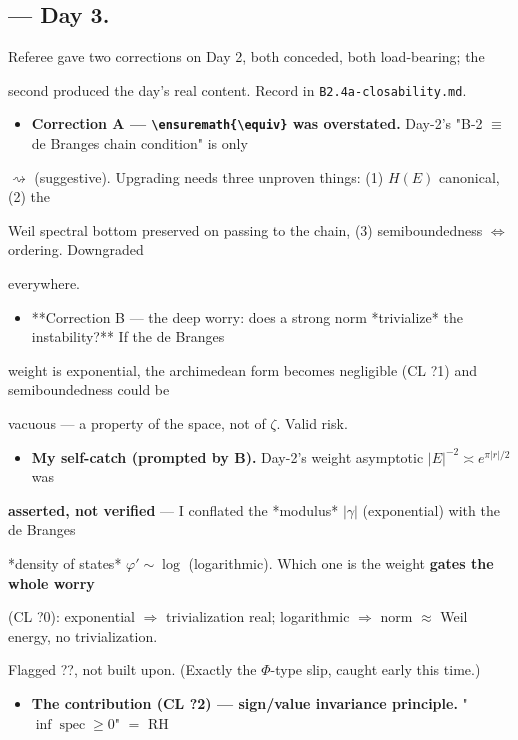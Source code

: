 \documentclass[10pt]{article}
\begin{document}
\subsection*{ --- Day 3.}
Referee gave two corrections on Day 2, both conceded, both load-bearing; the\par
second produced the day's real content. Record in \texttt{B2.4a-closability.md}.\par
\begin{itemize}
\item \textbf{Correction A --- \texttt{\textbackslash{}ensuremath\{\textbackslash{}equiv\}} was overstated.} Day-2's "B-2 $\equiv$ de Branges chain condition" is only
\end{itemize}
  $\rightsquigarrow$ (suggestive). Upgrading needs three unproven things: (1) $H(E)$ canonical, (2) the\par
  Weil spectral bottom preserved on passing to the chain, (3) semiboundedness $\iff$ ordering. Downgraded\par
  everywhere.\par
\begin{itemize}
\item **Correction B --- the deep worry: does a strong norm *trivialize* the instability?** If the de Branges
\end{itemize}
  weight is exponential, the archimedean form becomes negligible (CL ?1) and semiboundedness could be\par
  vacuous --- a property of the space, not of $\zeta$. Valid risk.\par
\begin{itemize}
\item \textbf{My self-catch (prompted by B).} Day-2's weight asymptotic $|E|^{-2}\asymp e^{\pi|r|/2}$ was
\end{itemize}
  \textbf{asserted, not verified} --- I conflated the *modulus* $|\gamma|$ (exponential) with the de Branges\par
  *density of states* $\varphi'\sim\log$ (logarithmic). Which one is the weight \textbf{gates the whole worry}\par
  (CL ?0): exponential \ensuremath{\Rightarrow} trivialization real; logarithmic \ensuremath{\Rightarrow} norm $\approx$ Weil energy, no trivialization.\par
  Flagged ??, not built upon. (Exactly the $\Phi$-type slip, caught early this time.)\par
\begin{itemize}
\item \textbf{The contribution (CL ?2) --- sign/value invariance principle.} "$\inf\operatorname{spec}\ge0$" $=$ RH
\end{itemize}
\end{document}
